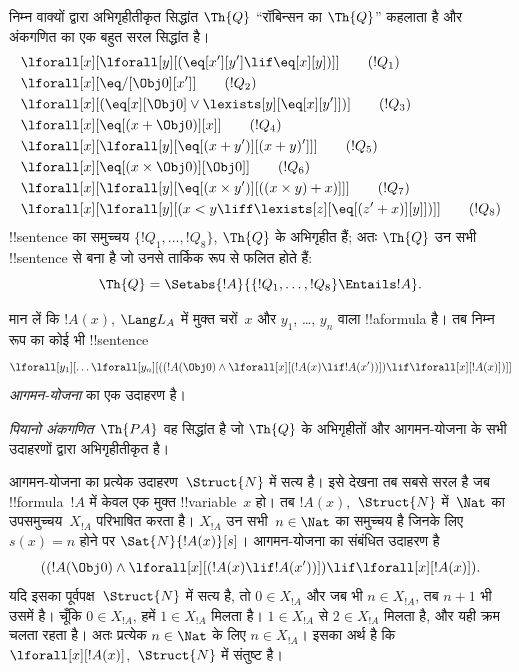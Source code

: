 \documentclass[../../../include/open-logic-section]{subfiles}
\begin{document}
\begin{defn}
निम्न वाक्यों द्वारा अभिगृहीतीकृत सिद्धांत $\Th{Q}$ ``रॉबिन्सन का
$\Th{Q}$'' कहलाता है और अंकगणित का एक बहुत सरल सिद्धांत है।
\begin{align*}
& \lforall[x][\lforall[y][(\eq[x'][y'] \lif \eq[x][y])]] \tag{$!Q_1$}\\
& \lforall[x][\eq/[\Obj 0][x']] \tag{$!Q_2$}\\
& \lforall[x][(\eq[x][\Obj 0] \lor \lexists[y][\eq[x][y']])] \tag{$!Q_3$}\\
& \lforall[x][\eq[(x + \Obj 0)][x]] \tag{$!Q_4$}\\
& \lforall[x][\lforall[y][\eq[(x + y')][(x + y)']]] \tag{$!Q_5$}\\
& \lforall[x][\eq[(x \times \Obj 0)][\Obj 0]] \tag{$!Q_6$}\\
& \lforall[x][\lforall[y][\eq[(x \times y')][((x \times y) + x)]]] \tag{$!Q_7$}\\
& \lforall[x][\lforall[y][(x < y \liff \lexists[z][\eq[(z' + x)][y]])]] \tag{$!Q_8$}
\end{align*}
!!{sentence} का समुच्चय $\{!Q_1, \dots, !Q_8\}$, $\Th{Q}$ के अभिगृहीत हैं;
अतः $\Th{Q}$ उन सभी !!{sentence} से बना है जो उनसे तार्किक रूप से फलित होते
हैं:
\[
\Th{Q} = \Setabs{!A}{\{!Q_1, \dots, !Q_8\} \Entails !A}.
\]
\end{defn}

\begin{defn}
मान लें कि $!A(x)$, $\Lang L_A$ में मुक्त चरों~$x$ और $y_1$, \dots,
$y_n$ वाला !!a{formula} है। तब निम्न रूप का कोई भी !!{sentence}
\[
\lforall[y_1][\dots\lforall[y_n][((!A(\Obj 0) \land \lforall[x][(!A(x)
\lif !A(x'))]) \lif \lforall[x][!A(x)])]]
\]
\emph{आगमन-योजना} का एक उदाहरण है।

\emph{पियानो अंकगणित}~$\Th{PA}$ वह सिद्धांत है जो $\Th{Q}$ के अभिगृहीतों और
आगमन-योजना के सभी उदाहरणों द्वारा अभिगृहीतीकृत है।
\end{defn}

\begin{explain}
आगमन-योजना का प्रत्येक उदाहरण~$\Struct{N}$ में सत्य है। इसे देखना तब सबसे
सरल है जब !!{formula}~$!A$ में केवल एक मुक्त !!{variable}~$x$ हो। तब
$!A(x)$,~$\Struct{N}$ में~$\Nat$ का उपसमुच्चय~$X_{!A}$ परिभाषित करता है।
$X_{!A}$ उन सभी~$n \in \Nat$ का समुच्चय है जिनके लिए $s(x) = n$ होने पर
$\Sat{N}{!A(x)}[s]$। आगमन-योजना का संबंधित उदाहरण है
\[
((!A(\Obj 0) \land \lforall[x][(!A(x) \lif !A(x'))]) \lif 
  \lforall[x][!A(x)]).
\]
यदि इसका पूर्वपक्ष~$\Struct{N}$ में सत्य है, तो $0 \in X_{!A}$ और जब भी
$n \in X_{!A}$, तब $n+1$ भी उसमें है। चूँकि $0 \in X_{!A}$, हमें $1 \in
X_{!A}$ मिलता है। $1 \in X_{!A}$ से $2 \in X_{!A}$ मिलता है, और यही क्रम
चलता रहता है। अतः प्रत्येक $n \in \Nat$ के लिए $n \in X_{!A}$। इसका अर्थ
है कि $\lforall[x][!A(x)]$,~$\Struct{N}$ में संतुष्ट है।
\end{explain}
\end{document}

